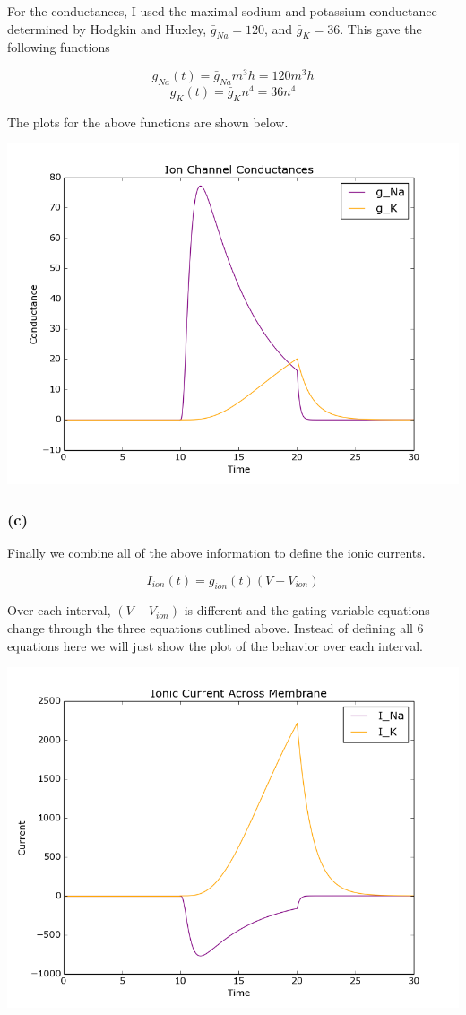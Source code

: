 \documentclass[letterpaper,10pt,english]{/usr/share/sphinx/texinputs/sphinxhowto}
\begin{document}
For the conductances, I used the maximal sodium and potassium
conductance determined by Hodgkin and Huxley, $\bar g_{Na} = 120$, and
$\bar g_K = 36$. This gave the following functions

\[g_{Na}(t) = \bar g_{Na}m^3h = 120m^3h\]
\[g_K(t) = \bar g_Kn^4 = 36n^4\]

The plots for the above functions are shown below.

\includegraphics[scale=0.5]{con.png}

\subsubsection{(c)}\label{c}

Finally we combine all of the above information to define the ionic
currents.

\[I_{ion}(t) = g_{ion}(t)(V-V_{ion})\]

Over each interval, $(V-V_{ion})$ is different and the gating variable
equations change through the three equations outlined above. Instead of
defining all 6 equations here we will just show the plot of the behavior
over each interval.

\includegraphics[scale=0.5]{cur.png}
\end{document}
